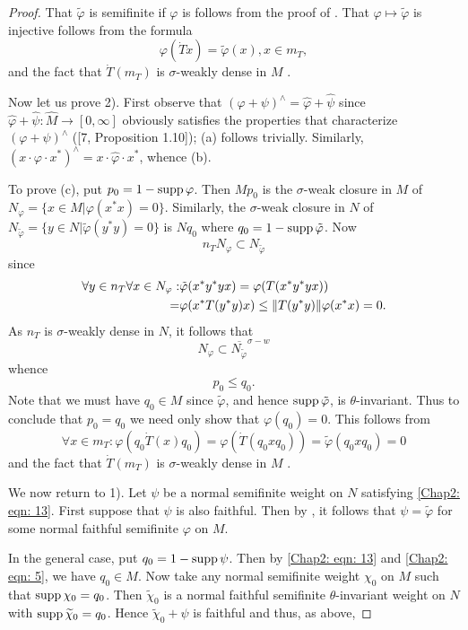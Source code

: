 \begin{proof}
    That $\tilde{\varphi}$ is semifinite if $\varphi$ is follows from the proof of \cite[Proposition 2.3]{7}. That $\varphi\mapsto \tilde{\varphi}$ is injective follows from the formula
    \[
        \varphi(\dot{T}x)=\tilde{\varphi}(x),x\in m_T,
    \]
    and the fact that $\dot{T}(m_T)$ is $\sigma$-weakly dense in $M$ \cite[Proposition 2.5]{7}. \par
    Now let us prove 2). First observe that $(\varphi+\psi)^\wedge=\hat{\varphi}+\hat{\psi}$ since $\hat{\varphi}+\hat{\psi}:\hat{M}\to [0,\infty]$ obviously satisfies the properties that characterize $(\varphi+\psi)^\wedge$ ([7, Proposition 1.10]); (a)
    follows trivially. Similarly, $(x\cdot \varphi\cdot x^*)^\wedge=x\cdot \hat{\varphi}\cdot x^*$, whence (b).\par
    To prove (c), put $p_0=1-\operatorname{supp} \varphi$. Then $Mp_0$ is the $\sigma$-weak closure in $M$ of $N_\varphi=\{x\in M|\varphi(x^*x)=0\}$. Similarly, the $\sigma$-weak closure in $N$ of $N_{\tilde{\varphi}}=\{y\in N|\tilde{\varphi}(y^*y)=0\}$ is $Nq_0$ where $q_0=1-\operatorname{supp} \tilde{\varphi}$. Now
    \[
        n_TN_\varphi\subset N_{\tilde{\varphi}}
    \]
    since
    \[
        \begin{split}
            \forall y\in n_T\forall x\in N_\varphi:&\tilde{\varphi}(x^*y^*yx)=\varphi(T(x^*y^*yx))\\
            =&\varphi(x^*T(y^*y)x)\leq \norm{T(y^*y)}\varphi(x^*x)=0.
        \end{split}
    \]
    As $n_T$ is $\sigma$-weakly dense in $N$, it follows that
    \[
        N_\varphi\subset \overline{N_{\tilde{\varphi}}}^{\sigma-w}
    \]
    whence
    \[
        p_0\leq q_0.
    \]
    Note that we must have $q_0\in M$ since $\tilde{\varphi}$, and hence $\operatorname{supp} \tilde{\varphi}$, is $\theta$-invariant. Thus to conclude that $p_0=q_0$ we need only show that $\varphi(q_0)=0$. This follows from
    \[
        \forall x\in m_T:\varphi(q_0\dot{T}(x)q_0)=\varphi(\dot{T}(q_0xq_0))=\tilde{\varphi}(q_0xq_0)=0
    \]
    and the fact that $\dot{T}(m_T)$ is $\sigma$-weakly dense in $M$ \cite[Proposition 2.5]{7}.\par
    We now return to 1). Let $\psi$ be a normal semifinite weight on
    $N$ satisfying \eqref{Chap2: eqn: 13}. First suppose that $\psi$ is also faithful. Then by \cite[(proof of) Theorem 3.7]{5}, it follows that $\psi=\tilde{\varphi}$ for some normal faithful semifinite $\varphi$ on $M$.\par
    In the general case, put $q_0=1-\operatorname{supp} \psi$. Then by \eqref{Chap2: eqn: 13} and \eqref{Chap2: eqn: 5}, we have $q_0\in M$. Now take any normal semifinite weight $\chi_0$ on $M$ such that $\operatorname{supp}\chi_0=q_0$. Then $\widetilde{\chi}_0$ is a normal faithful semifinite $\theta$-invariant weight on $N$ with $\operatorname{supp} \widetilde{\chi}_0=q_0$. Hence $\widetilde{\chi}_0+\psi$ is faithful and thus, as above,

\end{proof}
